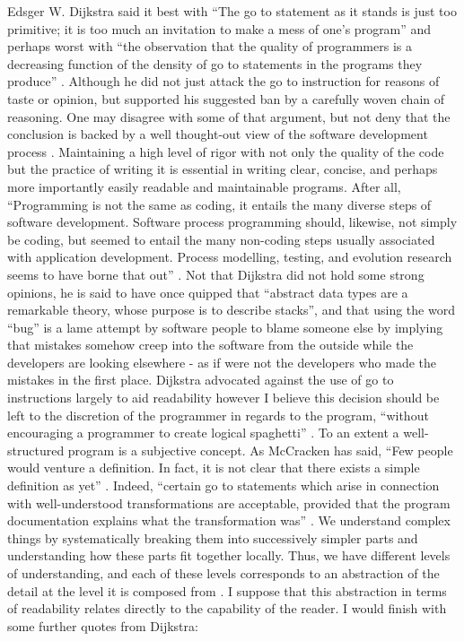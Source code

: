 \documentclass{scrartcl}
\begin{document}
Edsger W. Dijkstra said it best with ``The go to statement as it stands is just too primitive; it is too much an invitation to make a mess of one's program'' and perhaps worst with ``the observation that the quality of programmers is a decreasing function of the density of go to statements in the programs they produce'' \cite{dijkstra1968letters}. Although he did not just attack the go to instruction for reasons of taste or opinion, but supported his suggested ban by a carefully woven chain of reasoning. One may disagree with some of that argument, but not deny that the conclusion is backed by a well thought-out view of the software development process \cite{meyer1988object}. Maintaining a high level of rigor with not only the quality of the code but the practice of writing it is essential in writing clear, concise, and perhaps more importantly easily readable and maintainable programs. After all, ``Programming is not the same as coding, it entails the many diverse steps of software development. Software process programming should, likewise, not simply be coding, but seemed to entail the many non-coding steps usually associated with application development. Process modelling, testing, and evolution research seems to have borne that out'' \cite{osterweil1987software}. Not that Dijkstra did not hold some strong opinions, he is said to have once quipped that ``abstract data types are a remarkable theory, whose purpose is to describe stacks'', and that using the word ``bug'' is a lame attempt by software people to blame someone else by implying that mistakes somehow creep into the software from the outside while the developers are looking elsewhere - as if were not the developers who made the mistakes in the first place. 
Dijkstra advocated against the use of go to instructions largely to aid readability however I believe this decision should be left to the discretion of the programmer in regards to the program, ``without encouraging a programmer to create logical spaghetti'' \cite{knuth1974structured}. To an extent a well-structured program is a subjective concept. As McCracken has said, ``Few people would venture a definition. In fact, it is not clear that there exists a simple definition as yet'' \cite{mccracken1979revolution}. Indeed, ``certain go to statements which arise in connection with well-understood transformations are acceptable, provided that the program documentation explains what the transformation was'' \cite{knuth1974structured}. We understand complex things by systematically breaking them into successively simpler parts and understanding how these parts fit together locally. Thus, we have different levels of understanding, and each of these levels corresponds to an abstraction of the detail at the level it is composed from \cite{knuth1974structured}. I suppose that this abstraction in terms of readability relates directly to the capability of the reader. I would finish with some further quotes from Dijkstra:
\end{document}
